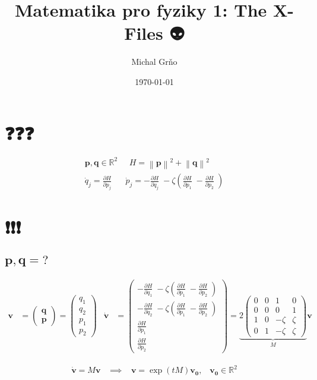 \documentclass[10pt,a4paper]{article}
\newcommand{\norm}[1]{\left\lVert#1\right\rVert}
\newcommand{\mat}[1]{
    \begin{pmatrix}
        #1
    \end{pmatrix}
}
\newcommand{\pd}[2]{\frac{\partial  #1}{\partial  #2} \;}
\begin{document}
\title{Matematika pro fyziky 1: The X-Files 👽️}
\author{Michal Grňo}
\date{\today}

\maketitle

\section{❓️❓️❓️}

\begin{gather*}
    \bm{p}, \bm{q} \in \mathbb{R}^2
    \;\;\;\;\;
    H = \norm{\bm{p}}^2 + \norm{\bm{q}}^2
    \\[10pt]
    \dot{q}_j = \pd{H}{p_j}
    \;\;\;\;\;
    \dot{p}_j = -\pd{H}{q_j} - \zeta \left( \pd{H}{p_1} - \pd{H}{p_2} \right)
\end{gather*}

\section{❗️❗️❗️}

\subsection{
    \texorpdfstring{
        $\pmb{ p,q = \mathit{?} }$
    }{
        p,q = ?
    }
}

\begin{align*}
    \bm{v} &= \mat{ \bm{q} \\ \bm{p} } = \mat{ q_1 \\ q_2 \\ p_1 \\ p_2}
    &
    \dot{\bm{v}} &= \mat{
        -\pd{H}{q_1} - \zeta \left( \pd{H}{p_1} - \pd{H}{p_2} \right) \\
        -\pd{H}{q_2} - \zeta \left( \pd{H}{p_1} - \pd{H}{p_2} \right) \\
        \pd{H}{p_1} \\ \pd{H}{p_2}
    }
    =
    \underbrace{
        2
        \mat{
            0 & 0 & 1 & 0 \\
            0 & 0 & 0 & 1 \\
            1 & 0 & - \zeta & \zeta \\
            0 & 1 & - \zeta & \zeta
        }
    }_M \bm{v}
\end{align*}

\begin{align*}
    \boxed{
        \dot{\bm{v}} = M \bm{v} \;\;\;
        \implies \;\;\;
        \bm{v} = \exp(t M) \bm{v_0}, \;\;\;
        \bm{v_0} \in \mathbb{R}^2
    }
\end{align*}
\end{document}
